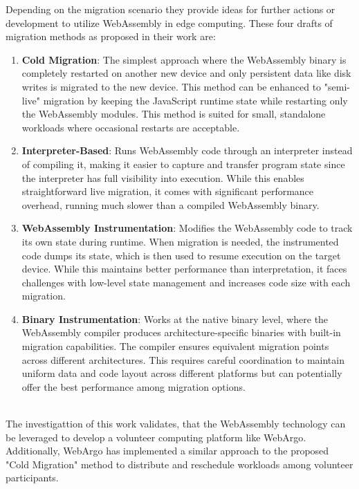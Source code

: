 Depending on the migration scenario they provide ideas for further actions or development to utilize WebAssembly in edge computing. These four drafts of migration methods as proposed in their work are:
\begin{enumerate}
  \item \textbf{Cold Migration}: The simplest approach where the WebAssembly binary is completely restarted on another new device and only persistent data like disk writes is migrated to the new device. This method can be enhanced to "semi-live" migration by keeping the JavaScript runtime state while restarting only the WebAssembly modules. This method is suited for small, standalone workloads where occasional restarts are acceptable. \cite{relatedwork:wasmedgecomputing}
  \item \textbf{Interpreter-Based}: Runs WebAssembly code through an interpreter instead of compiling it, making it easier to capture and transfer program state since the interpreter has full visibility into execution. While this enables straightforward live migration, it comes with significant performance overhead, running much slower than a compiled WebAssembly binary. \cite{relatedwork:wasmedgecomputing} 
  \item \textbf{WebAssembly Instrumentation}: Modifies the WebAssembly code to track its own state during runtime. When migration is needed, the instrumented code dumps its state, which is then used to resume execution on the target device. While this maintains better performance than interpretation, it faces challenges with low-level state management and increases code size with each migration. \cite{relatedwork:wasmedgecomputing}
  \item \textbf{Binary Instrumentation}: Works at the native binary level, where the WebAssembly compiler produces architecture-specific binaries with built-in migration capabilities. The compiler ensures equivalent migration points across different architectures. This requires careful coordination to maintain uniform data and code layout across different platforms but can potentially offer the best performance among migration options. \cite{relatedwork:wasmedgecomputing}
\end{enumerate}
~\\
The investigattion of this work validates, that the WebAssembly technology can be leveraged to develop a volunteer computing platform like WebArgo. Additionally, WebArgo has implemented a similar approach to the proposed "Cold Migration" method to distribute and reschedule workloads among volunteer participants.

